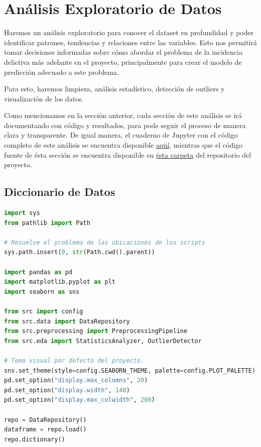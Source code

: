 \section{Análisis Exploratorio de Datos}

Haremos un análisis exploratorio para conocer el dataset en profundidad y poder identificar patrones, tendencias y relaciones entre las variables.
Esto nos permitirá tomar decisiones informadas sobre cómo abordar el problema de la incidencia delictiva más adelante en el proyecto,
principalmente para crear el modelo de predicción adecuado a este problema.

Para esto, haremos limpieza, análisis estadístico, detección de outliers y visualización de los datos.

Como mencionamos en la sección anterior, cada sección de este análisis se irá documentando con código y resultados, para pode seguir el
proceso de manera clara y transparente. De igual manera, el cuaderno de Jupyter con el código completo de este análisis se encuentra disponible
\href{https://github.com/wallsified/proyecto-final-aymdd/blob/yoba/modelo/notebooks/eda.ipynb}{aquí}, mientras que el código fuente de ésta
sección se encuentra disponible en \href{https://github.com/wallsified/proyecto-final-aymdd/tree/main/src/eda}{ésta carpeta} del repositorio
del proyecto.

\subsection{Diccionario de Datos}

\begin{lstlisting}[language=Python, caption={Código para generar el diccionario de datos}, label={lst:diccionario-datos}]
import sys
from pathlib import Path

# Resuelve el problema de las ubicaciones de los scripts
sys.path.insert(0, str(Path.cwd().parent))

import pandas as pd
import matplotlib.pyplot as plt
import seaborn as sns

from src import config
from src.data import DataRepository
from src.preprocessing import PreprocessingPipeline
from src.eda import StatisticsAnalyzer, OutlierDetector

# Tema visual por defecto del proyecto.
sns.set_theme(style=config.SEABORN_THEME, palette=config.PLOT_PALETTE)
pd.set_option("display.max_columns", 20)
pd.set_option("display.width", 140)
pd.set_option("display.max_colwidth", 200)

repo = DataRepository()
dataframe = repo.load()
repo.dictionary()
\end{lstlisting}


